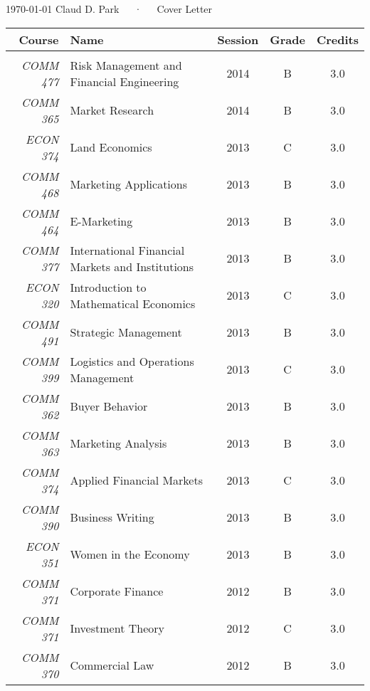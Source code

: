 \documentclass[11pt, a4paper]{awesome-cv}
\begin{document}
\makecvheader[R]

\makecvfooter
  {\today}
  {Claud D. Park~~~·~~~Cover Letter}
  {}

\makelettertitle

\begin{cvletter}

\usepackage{tabularx}
\begin{tabularx}{\linewidth}{ r|Xccc }
\Large Course & \Large  Name & \Large Session & \Large  Grade & \Large Credits \\
\hline
\newline
 & & & & \\
\textit{COMM 477} & \large Risk Management and Financial Engineering  &  2014 & B & 3.0 \\
\textit{COMM 365} & \large Market Research  &  2014 & B & 3.0 \\
\textit{ECON 374} & \large Land Economics &  2013 & C & 3.0 \\
\textit{COMM 468} & \large Marketing Applications &  2013 & B & 3.0 \\
\textit{COMM 464} & \large E-Marketing &  2013 & B & 3.0 \\
\textit{COMM 377} & \large International Financial Markets and Institutions &  2013 & B & 3.0 \\

\textit{ECON 320} & \large Introduction to Mathematical Economics &  2013 & C & 3.0 \\
\textit{COMM 491} & \large Strategic Management &  2013 & B & 3.0 \\
\textit{COMM 399} & \large Logistics and Operations Management &  2013 & C & 3.0 \\

\textit{COMM 362} & \large Buyer Behavior  &  2013 & B & 3.0 \\
\textit{COMM 363} & \large Marketing Analysis  &  2013 & B & 3.0 \\
\textit{COMM 374} & \large Applied Financial Markets  &  2013 & C & 3.0 \\
\textit{COMM 390} & \large Business Writing  &  2013 & B & 3.0 \\
\textit{ECON 351} & \large Women in the Economy  &  2013 & B & 3.0 \\
\textit{COMM 371} & \large Corporate Finance  &  2012 & B & 3.0 \\
\textit{COMM 371} & \large Investment Theory &  2012 & C & 3.0 \\
\textit{COMM 370} & \large Commercial Law  &  2012 & B & 3.0 \\



\end{tabularx}
\end{cvletter}
\end{document}
